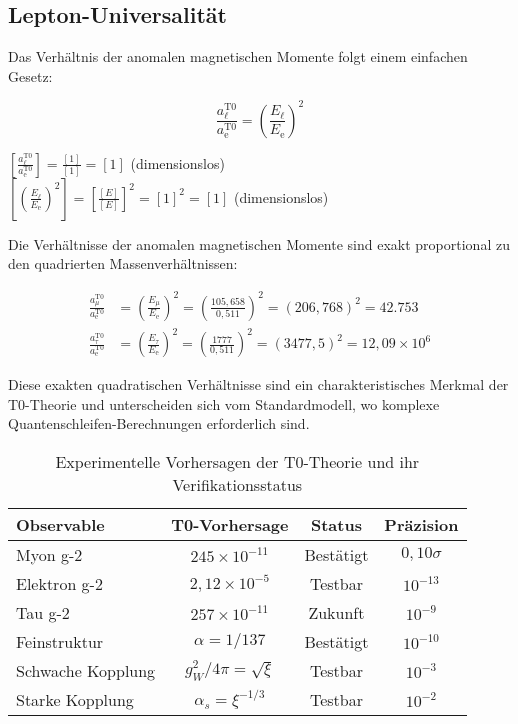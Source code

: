 \documentclass[12pt,a4paper]{article}
\newcommand{\ee}{\text{$\mathrm{e}$}}
\newcommand{\mmu}{\text{$\mu$}}
\newcommand{\ttau}{\text{$\tau$}}
\theoremstyle{definition}
\begin{document}
\subsection{Lepton-Universalität}

Das Verhältnis der anomalen magnetischen Momente folgt einem einfachen Gesetz:

\begin{equation}
	\frac{a_{\ell}^{\text{T0}}}{a_{\ee}^{\text{T0}}} = \left(\frac{E_{\ell}}{E_{\ee}}\right)^2
\end{equation}

\begin{einheitencheck}
	$\left[\frac{a_{\ell}^{\text{T0}}}{a_{\ee}^{\text{T0}}}\right] = \frac{[1]}{[1]} = [1]$ (dimensionslos)\\
	$\left[\left(\frac{E_{\ell}}{E_{\ee}}\right)^2\right] = \left[\frac{[E]}{[E]}\right]^2 = [1]^2 = [1]$ (dimensionslos) \checkmark
\end{einheitencheck}

\begin{verhaltnis}
	Die Verhältnisse der anomalen magnetischen Momente sind exakt proportional zu den quadrierten Massenverhältnissen:
	
	\begin{align}
		\frac{a_{\mmu}^{\text{T0}}}{a_{\ee}^{\text{T0}}} &= \left(\frac{E_{\mmu}}{E_{\ee}}\right)^2 = \left(\frac{105,658}{0,511}\right)^2 = (206,768)^2 = 42.753\\
		\frac{a_{\ttau}^{\text{T0}}}{a_{\ee}^{\text{T0}}} &= \left(\frac{E_{\ttau}}{E_{\ee}}\right)^2 = \left(\frac{1777}{0,511}\right)^2 = (3477,5)^2 = 12,09 \times 10^6
	\end{align}
	
	Diese exakten quadratischen Verhältnisse sind ein charakteristisches Merkmal der T0-Theorie und unterscheiden sich vom Standardmodell, wo komplexe Quantenschleifen-Berechnungen erforderlich sind.
\end{verhaltnis}
\begin{table}[h]
	\centering
	\begin{tabular}{lccc}
		\toprule
		\textbf{Observable} & \textbf{T0-Vorhersage} & \textbf{Status} & \textbf{Präzision} \\
		\midrule
		Myon g-2 & $245 \times 10^{-11}$ & Bestätigt & $0,10\sigma$ \\
		Elektron g-2 & $2,12 \times 10^{-5}$ & Testbar & $10^{-13}$ \\
		Tau g-2 & $257 \times 10^{-11}$ & Zukunft & $10^{-9}$ \\
		Feinstruktur & $\alpha = 1/137$ & Bestätigt & $10^{-10}$ \\
		Schwache Kopplung & $g_W^2/4\pi = \sqrt{\xi}$ & Testbar & $10^{-3}$ \\
		Starke Kopplung & $\alpha_s = \xi^{-1/3}$ & Testbar & $10^{-2}$ \\
		\bottomrule
	\end{tabular}
	\caption{Experimentelle Vorhersagen der T0-Theorie und ihr Verifikationsstatus}
\end{table}
\end{document}

